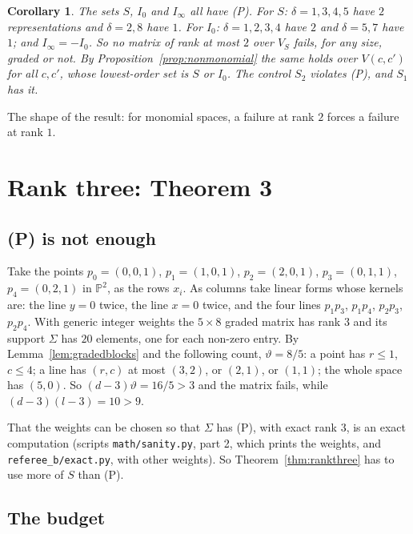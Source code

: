 \documentclass[11pt,a4paper]{article}
\theoremstyle{plain}
\newtheorem{corollary}{Corollary}
\theoremstyle{definition}
\newcommand{\vth}{\vartheta}
\newcommand{\Iz}{I_{0}}
\newcommand{\Ii}{I_{\infty}}
\newcommand{\scr}[1]{\nolinkurl{#1}}
\begin{document}
\begin{corollary}\label{cor:ranktwo}
The sets $S$, $\Iz$ and $\Ii$ all have \textup{(P)}. For $S$: $\delta=1,3,4,5$ have $2$ representations and $\delta=2,8$ have $1$. For $\Iz$: $\delta=1,2,3,4$ have $2$ and $\delta=5,7$ have $1$; and $\Ii=-\Iz$.
So no matrix of rank at most $2$ over $V_{S}$ fails, for any size, graded or not. By Proposition~\ref{prop:nonmonomial} the same holds over $V(c,c')$ for all $c,c'$, whose lowest-order set is $S$ or $\Iz$. The control $S_{2}$ violates \textup{(P)}, and $S_{1}$ has it.
\end{corollary}

The shape of the result: for monomial spaces, a failure at rank $2$ forces a failure at rank $1$.

\section{Rank three: Theorem 3}\label{sec:rankthree}

\subsection{(P) is not enough}\label{sec:fivebyeight}

Take the points $p_{0}=(0,0,1)$, $p_{1}=(1,0,1)$, $p_{2}=(2,0,1)$, $p_{3}=(0,1,1)$, $p_{4}=(0,2,1)$ in $\mathbb{P}^{2}$, as the rows $x_{i}$. As columns take linear forms whose kernels are: the line $y=0$ twice, the line $x=0$ twice, and the four lines $p_{1}p_{3}$, $p_{1}p_{4}$, $p_{2}p_{3}$,
$p_{2}p_{4}$. With generic integer weights the $5\times8$ graded matrix has rank $3$ and its support $\Sigma$ has $20$ elements, one for each non-zero entry. By Lemma~\ref{lem:gradedblocks} and the following count, $\vth=8/5$: a point has $r\le1$, $c\le4$; a line has $(r,c)$ at most
$(3,2)$, or $(2,1)$, or $(1,1)$; the whole space has $(5,0)$. So $(d-3)\vth=16/5>3$ and the matrix fails, while $(d-3)(l-3)=10>9$.

That the weights can be chosen so that $\Sigma$ has (P), with exact rank $3$, is an exact computation (scripts \scr{math/sanity.py}, part 2, which prints the weights, and \scr{referee_b/exact.py}, with other weights). So Theorem~\ref{thm:rankthree} has to use more of $S$ than (P).

\subsection{The budget}
\end{document}
